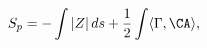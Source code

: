 \begin{equation} \label{Sp}
 S_{p} = - \int |Z| \, ds + \frac{1}{2} \int \langle \Gamma,\CA \rangle,
\end{equation}

